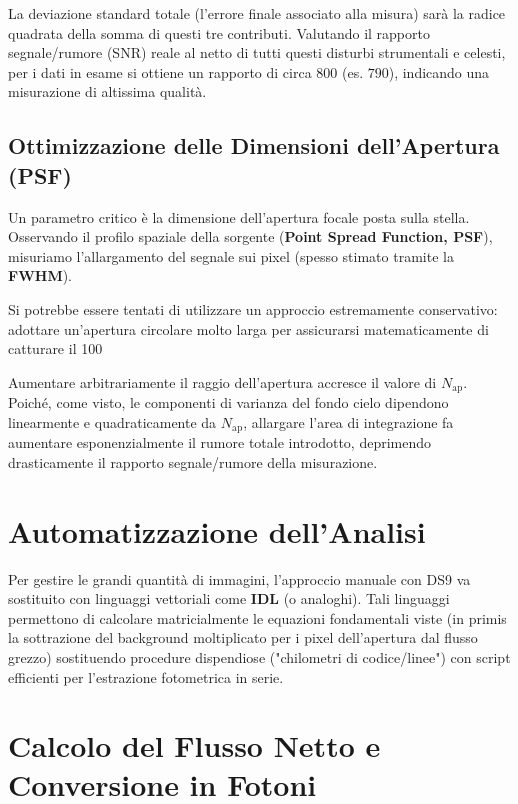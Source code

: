 La deviazione standard totale (l'errore finale associato alla misura) sarà la radice quadrata della somma di questi tre contributi. Valutando il rapporto segnale/rumore (SNR) reale al netto di tutti questi disturbi strumentali e celesti, per i dati in esame si ottiene un rapporto di circa $800$ (es. $790$), indicando una misurazione di altissima qualità.

\subsection{Ottimizzazione delle Dimensioni dell'Apertura (PSF)}

Un parametro critico è la dimensione dell'apertura focale posta sulla stella. Osservando il profilo spaziale della sorgente (\textbf{Point Spread Function, PSF}), misuriamo l'allargamento del segnale sui pixel (spesso stimato tramite la \textbf{FWHM}).

Si potrebbe essere tentati di utilizzare un approccio estremamente conservativo: adottare un'apertura circolare molto larga per assicurarsi matematicamente di catturare il 100%

Aumentare arbitrariamente il raggio dell'apertura accresce il valore di $N_{\text{ap}}$. Poiché, come visto, le componenti di varianza del fondo cielo dipendono linearmente e quadraticamente da $N_{\text{ap}}$, allargare l'area di integrazione fa aumentare esponenzialmente il rumore totale introdotto, deprimendo drasticamente il rapporto segnale/rumore della misurazione.

\section{Automatizzazione dell'Analisi}

Per gestire le grandi quantità di immagini, l'approccio manuale con DS9 va sostituito con linguaggi vettoriali come \textbf{IDL} (o analoghi). Tali linguaggi permettono di calcolare matricialmente le equazioni fondamentali viste (in primis la sottrazione del background moltiplicato per i pixel dell'apertura dal flusso grezzo) sostituendo procedure dispendiose ("chilometri di codice/linee") con script efficienti per l'estrazione fotometrica in serie.

\section{Calcolo del Flusso Netto e Conversione in Fotoni}

